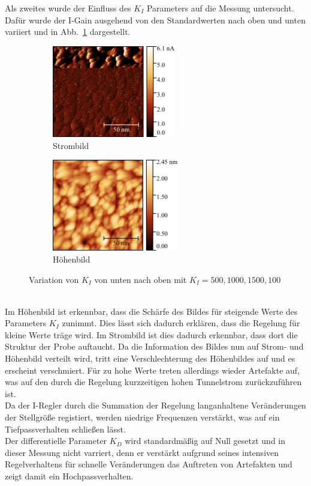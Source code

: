 \documentclass[a4paper,twoside,final]{article}
\begin{document}
Als zweites wurde der Einfluss des $K_I$ Parameters auf die Messung untersucht. Dafür wurde der I-Gain ausgehend von den Standardwerten nach oben und unten variiert und in Abb.~\ref{fig:IGlied} dargestellt.
\begin{figure}[htp]
    \centering
    \begin{subfigure}{0.45\textwidth}
        \includegraphics[height=4cm]{Bilder/Image01980_IGain_Strom.pdf}
        \caption{Strombild}
    \end{subfigure}
    \hspace{0.5cm}
    \begin{subfigure}{0.45\textwidth}
        \includegraphics[height=4cm]{Bilder/Image01980_IGain.pdf}
        \caption{Höhenbild}
    \end{subfigure}
    \caption{Variation von $K_I$ von unten nach oben mit $K_I = 500, 1000, 1500, 100$}
    \label{fig:IGlied}
\end{figure}\\
Im Höhenbild ist erkennbar, dass die Schärfe des Bildes für steigende Werte des Parameters $K_I$ zunimmt. Dies lässt sich dadurch erklären, dass die Regelung für kleine Werte träge wird. Im Strombild ist dies dadurch erkennbar, dass dort die Struktur der Probe auftaucht. Da die Information des Bildes nun auf Strom- und Höhenbild verteilt wird, tritt eine Verschlechterung des Höhenbildes auf und es erscheint verschmiert. Für zu hohe Werte treten allerdings wieder Artefakte auf, was auf den durch die Regelung kurzzeitigen hohen Tunnelstrom zurückzuführen ist.\\
Da der I-Regler durch die Summation der Regelung langanhaltene Veränderungen der Stellgröße registiert, werden niedrige Frequenzen verstärkt, was auf ein Tiefpassverhalten schließen lässt.\\
Der differentielle Parameter $K_D$ wird standardmäßig auf Null gesetzt und in dieser Messung nicht varriert, denn er verstärkt aufgrund seines intensiven Regelverhaltens für schnelle Veränderungen das Auftreten von Artefakten und zeigt damit ein Hochpassverhalten.
\end{document}
